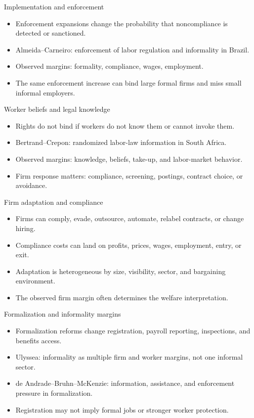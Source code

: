 \documentclass[aspectratio=169,11pt]{beamer}
\begin{document}
\begin{frame}{Implementation and enforcement}
\begin{itemize}
    \item Enforcement expansions change the probability that noncompliance is detected or sanctioned.
    \item Almeida--Carneiro: enforcement of labor regulation and informality in Brazil.
    \item Observed margins: formality, compliance, wages, employment.
    \item The same enforcement increase can bind large formal firms and miss small informal employers.
\end{itemize}
\end{frame}

\begin{frame}{Worker beliefs and legal knowledge}
\begin{itemize}
    \item Rights do not bind if workers do not know them or cannot invoke them.
    \item Bertrand--Crepon: randomized labor-law information in South Africa.
    \item Observed margins: knowledge, beliefs, take-up, and labor-market behavior.
    \item Firm response matters: compliance, screening, postings, contract choice, or avoidance.
\end{itemize}
\end{frame}

\begin{frame}{Firm adaptation and compliance}
\begin{itemize}
    \item Firms can comply, evade, outsource, automate, relabel contracts, or change hiring.
    \item Compliance costs can land on profits, prices, wages, employment, entry, or exit.
    \item Adaptation is heterogeneous by size, visibility, sector, and bargaining environment.
    \item The observed firm margin often determines the welfare interpretation.
\end{itemize}
\end{frame}

\begin{frame}{Formalization and informality margins}
\begin{itemize}
    \item Formalization reforms change registration, payroll reporting, inspections, and benefits access.
    \item Ulyssea: informality as multiple firm and worker margins, not one informal sector.
    \item de Andrade--Bruhn--McKenzie: information, assistance, and enforcement pressure in formalization.
    \item Registration may not imply formal jobs or stronger worker protection.
\end{itemize}
\end{frame}
\end{document}
